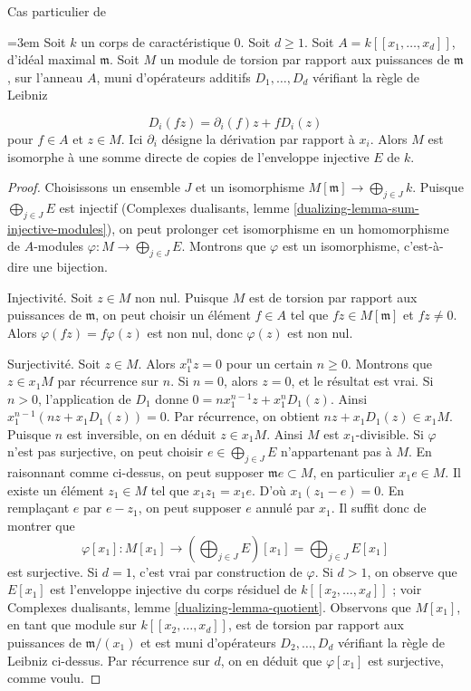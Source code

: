 \begin{lemma}
\label{lemma-structure-torsion-D-module-regular}
\begin{reference}
Cas particulier de \cite[Theorem 2.4]{Lyubeznik}
\end{reference}
{\emergencystretch=3em
Soit $k$ un corps de caractéristique $0$. Soit $d \geq 1$. Soit $A = k[[x_1, \ldots, x_d]]$, d'idéal maximal $\mathfrak m$. Soit $M$ un module de torsion par rapport aux puissances de $\mathfrak m$, sur l'anneau $A$, muni d'opérateurs additifs $D_1, \ldots, D_d$ vérifiant la règle de Leibniz
\par}
$$
D_i(fz) = \partial_i(f) z + f D_i(z)
$$
pour $f \in A$ et $z \in M$. Ici $\partial_i$ désigne la dérivation par rapport à $x_i$. Alors $M$ est isomorphe à une somme directe de copies de l'enveloppe injective $E$ de $k$.
\end{lemma}

\begin{proof}
Choisissons un ensemble $J$ et un isomorphisme $M[\mathfrak m] \to \bigoplus_{j \in J} k$. Puisque $\bigoplus_{j \in J} E$ est injectif (Complexes dualisants, lemme \ref{dualizing-lemma-sum-injective-modules}), on peut prolonger cet isomorphisme en un homomorphisme de $A$-modules $\varphi : M \to \bigoplus_{j \in J} E$. Montrons que $\varphi$ est un isomorphisme, c'est-à-dire une bijection.

\medskip\noindent
Injectivité. Soit $z \in M$ non nul. Puisque $M$ est de torsion par rapport aux puissances de $\mathfrak m$, on peut choisir un élément $f \in A$ tel que $fz \in M[\mathfrak m]$ et $fz \not = 0$. Alors $\varphi(fz) = f\varphi(z)$ est non nul, donc $\varphi(z)$ est non nul.

\medskip\noindent
Surjectivité. Soit $z \in M$. Alors $x_1^n z = 0$ pour un certain $n \geq 0$. Montrons que $z \in x_1M$ par récurrence sur $n$. Si $n = 0$, alors $z = 0$, et le résultat est vrai. Si $n > 0$, l'application de $D_1$ donne $0 = n x_1^{n - 1} z + x_1^nD_1(z)$. Ainsi $x_1^{n - 1}(nz + x_1D_1(z)) = 0$. Par récurrence, on obtient $nz + x_1D_1(z) \in x_1M$. Puisque $n$ est inversible, on en déduit $z \in x_1M$. Ainsi $M$ est $x_1$-divisible. Si $\varphi$ n'est pas surjective, on peut choisir $e \in \bigoplus_{j \in J} E$ n'appartenant pas à $M$. En raisonnant comme ci-dessus, on peut supposer $\mathfrak m e \subset M$, en particulier $x_1 e \in M$. Il existe un élément $z_1 \in M$ tel que $x_1 z_1 = x_1 e$. D'où $x_1(z_1 - e) = 0$. En remplaçant $e$ par $e - z_1$, on peut supposer $e$ annulé par $x_1$. Il suffit donc de montrer que
$$
\varphi[x_1] :
M[x_1]
\longrightarrow
\left(\bigoplus\nolimits_{j \in J} E\right)[x_1] =
\bigoplus\nolimits_{j \in J} E[x_1]
$$
est surjective. Si $d = 1$, c'est vrai par construction de $\varphi$. Si $d > 1$, on observe que $E[x_1]$ est l'enveloppe injective du corps résiduel de $k[[x_2, \ldots, x_d]]$ ; voir Complexes dualisants, lemme \ref{dualizing-lemma-quotient}. Observons que $M[x_1]$, en tant que module sur $k[[x_2, \ldots, x_d]]$, est de torsion par rapport aux puissances de $\mathfrak m/(x_1)$ et est muni d'opérateurs $D_2, \ldots, D_d$ vérifiant la règle de Leibniz ci-dessus. Par récurrence sur $d$, on en déduit que $\varphi[x_1]$ est surjective, comme voulu.
\end{proof}

